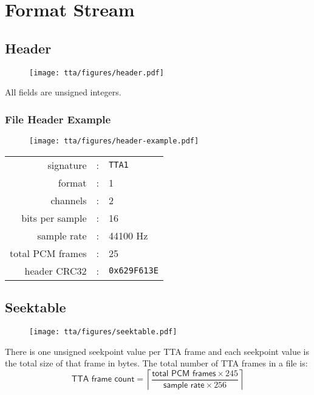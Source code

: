
\section{Format Stream}


\clearpage

\subsection{Header}
\begin{figure}[h]
  \texttt{[image: tta/figures/header.pdf]}
\end{figure}
\par
\noindent
All fields are unsigned integers.

\subsubsection{File Header Example}
\begin{figure}[h]
  \texttt{[image: tta/figures/header-example.pdf]}
\end{figure}
\begin{table}[h]
  \begin{tabular}{rcl}
    \textsf{signature} & : & \texttt{TTA1} \\
    \textsf{format} & : & 1 \\
    \textsf{channels} & : & 2 \\
    \textsf{bits per sample} & : & 16 \\
    \textsf{sample rate} & : & 44100 Hz \\
    \textsf{total PCM frames} & : & 25 \\
    \textsf{header CRC32} & : & \texttt{0x629F613E} \\
  \end{tabular}
\end{table}

\clearpage

\subsection{Seektable}
\begin{figure}[h]
  \texttt{[image: tta/figures/seektable.pdf]}
\end{figure}
\par
\noindent
There is one unsigned seekpoint value per TTA frame
and each seekpoint value is the total size of that frame in bytes.
The total number of TTA frames in a file is:
\begin{equation*}
\textsf{TTA frame count} = \left\lceil\frac{\textsf{total PCM frames} \times 245}{\textsf{sample rate} \times 256}\right\rceil
\end{equation*}
